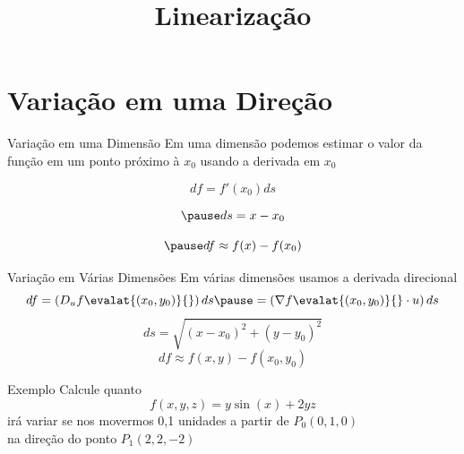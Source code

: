 
\usepackage{calculo_varias_variaveis-1}

\title {Linearização}



\addtitle

\section{Variação em uma Direção}


\begin{frame}{Variação em uma Dimensão}
  Em uma dimensão podemos estimar o valor da função em um ponto próximo à $x_0$
  usando a derivada em $x_0$

  \pause
  \[
    df = f'(x_0) ds
  \]

  \[
    \pause
    ds = x - x_0
  \]

  \[
    \pause
    df \approx f(x) - f(x_0)
  \]
\end{frame}

\begin{frame}{Variação em Várias Dimensões}
  Em várias dimensões usamos a derivada direcional
  \pause
  \[
    df
    = \left(D_u f\evalat{(x_0, y_0)}{}\right) ds
    \pause
    = \left(\nabla f\evalat{(x_0, y_0)}{} \cdot u\right) ds
  \]
  \pause
  \[
    ds = \sqrt{(x - x_0)^2 + (y-y_0)^2}
  \]
  \pause
  \[
    df \approx f(x, y) - f(x_0, y_0)
  \]
\end{frame}

\addtocounter{exemplo}{1}
\begin{frame}{Exemplo \theexemplo}
  Calcule quanto
  \[
    f(x, y, z) = y\sin(x) + 2yz
  \]
  irá variar se nos movermos 0,1 unidades a partir de \(P_0(0, 1, 0)\) \\
  na direção do ponto \(P_1(2, 2, -2)\)
\end{frame}


